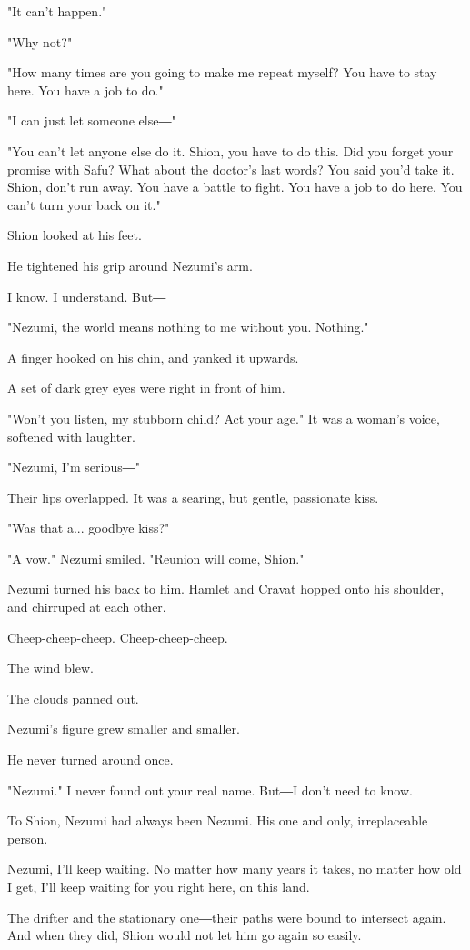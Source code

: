 "It can't happen."

"Why not?"

"How many times are you going to make me repeat myself? You have to stay
here. You have a job to do."

"I can just let someone else―"

"You can't let anyone else do it. Shion, you have to do this. Did you
forget your promise with Safu? What about the doctor's last words? You
said you'd take it. Shion, don't run away. You have a battle to fight.
You have a job to do here. You can't turn your back on it."

Shion looked at his feet.

He tightened his grip around Nezumi's arm.

I know. I understand. But―

"Nezumi, the world means nothing to me without you. Nothing."

A finger hooked on his chin, and yanked it upwards.

A set of dark grey eyes were right in front of him.

"Won't you listen, my stubborn child? Act your age." It was a woman's
voice, softened with laughter.

"Nezumi, I'm serious―"

Their lips overlapped. It was a searing, but gentle, passionate kiss.

"Was that a... goodbye kiss?"

"A vow." Nezumi smiled. "Reunion will come, Shion."

Nezumi turned his back to him. Hamlet and Cravat hopped onto his
shoulder, and chirruped at each other.

Cheep-cheep-cheep. Cheep-cheep-cheep.

The wind blew.

The clouds panned out.

Nezumi's figure grew smaller and smaller.

He never turned around once.

"Nezumi." I never found out your real name. But―I don't need to know.

To Shion, Nezumi had always been Nezumi. His one and only, irreplaceable
person.

Nezumi, I'll keep waiting. No matter how many years it takes, no matter
how old I get, I'll keep waiting for you right here, on this land.

The drifter and the stationary one―their paths were bound to intersect
again. And when they did, Shion would not let him go again so easily.

